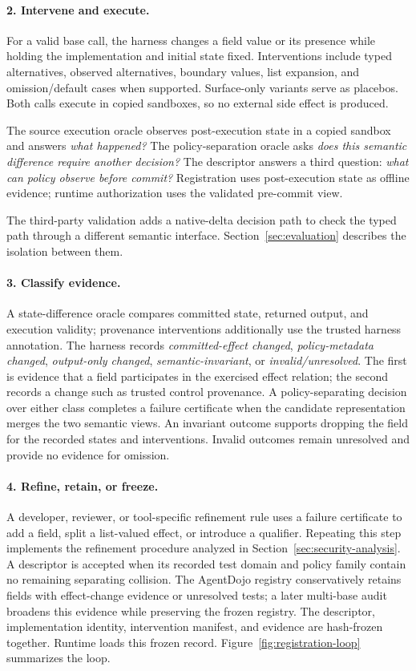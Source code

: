 \paragraph{2. Intervene and execute.}
For a valid base call, the harness changes a field value or its presence while
holding the implementation and initial state fixed.  Interventions include
typed alternatives, observed alternatives, boundary values, list expansion,
and omission/default cases when supported.  Surface-only variants serve as
placebos.  Both calls execute in copied sandboxes, so no external side effect
is produced.

The source execution oracle observes post-execution state in a copied sandbox
and answers \emph{what happened?} The policy-separation oracle asks \emph{does
this semantic difference require another decision?} The descriptor answers a
third question: \emph{what can policy observe before commit?} Registration uses
post-execution state as offline evidence; runtime authorization uses the
validated pre-commit view.

The third-party validation adds a native-delta decision path to check the typed
path through a different semantic interface. Section~\ref{sec:evaluation}
describes the isolation between them.

\paragraph{3. Classify evidence.}
A state-difference oracle compares committed state, returned output, and
execution validity; provenance interventions additionally use the trusted
harness annotation.  The harness records \emph{committed-effect changed},
\emph{policy-metadata changed}, \emph{output-only changed},
\emph{semantic-invariant}, or \emph{invalid/unresolved}.  The first is evidence
that a field participates in the exercised effect relation; the second records
a change such as trusted control provenance.  A policy-separating decision
over either class completes a failure certificate when the candidate
representation merges the two semantic views. An invariant outcome supports dropping the field for the recorded states
and interventions. Invalid outcomes remain unresolved and provide no evidence
for omission.

\paragraph{4. Refine, retain, or freeze.}
A developer, reviewer, or tool-specific refinement rule uses a failure certificate
to add a field, split a list-valued effect, or introduce a qualifier. Repeating
this step implements the refinement procedure analyzed in
Section~\ref{sec:security-analysis}. A descriptor is accepted when its recorded
test domain and policy family contain no remaining separating collision. The
AgentDojo registry conservatively retains fields with effect-change evidence or
unresolved tests; a later multi-base audit broadens this evidence while
preserving the frozen registry.
The descriptor, implementation identity, intervention manifest, and evidence
are hash-frozen together. Runtime loads this frozen record.
Figure~\ref{fig:registration-loop} summarizes the loop.

